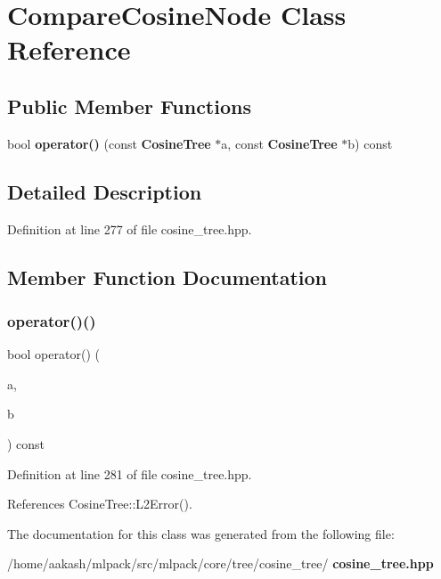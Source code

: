 \section{Compare\+Cosine\+Node Class Reference}
\label{classmlpack_1_1tree_1_1CompareCosineNode}
\subsection*{Public Member Functions}
\begin{DoxyCompactItemize}
\item 
bool \textbf{ operator()} (const \textbf{ Cosine\+Tree} $\ast$a, const \textbf{ Cosine\+Tree} $\ast$b) const
\end{DoxyCompactItemize}


\subsection{Detailed Description}


Definition at line 277 of file cosine\+\_\+tree.\+hpp.



\subsection{Member Function Documentation}
\mbox{\label{classmlpack_1_1tree_1_1CompareCosineNode_ae30c4e72891814784ec496c02dfa186d}} 
\subsubsection{operator()()}
{\footnotesize\ttfamily bool operator() (\begin{DoxyParamCaption}\item[{const \textbf{ Cosine\+Tree} $\ast$}]{a,  }\item[{const \textbf{ Cosine\+Tree} $\ast$}]{b }\end{DoxyParamCaption}) const\hspace{0.3cm}{\ttfamily [inline]}}



Definition at line 281 of file cosine\+\_\+tree.\+hpp.



References Cosine\+Tree\+::\+L2\+Error().



The documentation for this class was generated from the following file\+:\begin{DoxyCompactItemize}
\item 
/home/aakash/mlpack/src/mlpack/core/tree/cosine\+\_\+tree/\textbf{ cosine\+\_\+tree.\+hpp}\end{DoxyCompactItemize}
